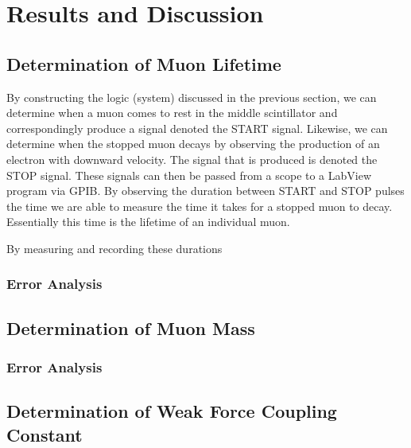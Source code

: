 
\section{Results and Discussion}

\subsection{Determination of Muon Lifetime}

By constructing the logic (system) discussed in the previous section, we can determine when a muon comes to rest in the middle scintillator and correspondingly produce a signal denoted the START signal.  Likewise, we can determine when the stopped muon decays by observing the production of an electron with downward velocity.  The signal that is produced is denoted the STOP signal.  These signals can then be passed from a scope to a LabView program via GPIB.  By observing the duration between START and STOP pulses the time we are able to measure the time it takes for a stopped muon to decay.  Essentially this time is the lifetime of an individual muon.  

By measuring and recording these durations 

\subsubsection{Error Analysis}

\subsection{Determination of Muon Mass}

\subsubsection{Error Analysis}

\subsection{Determination of Weak Force Coupling Constant}

